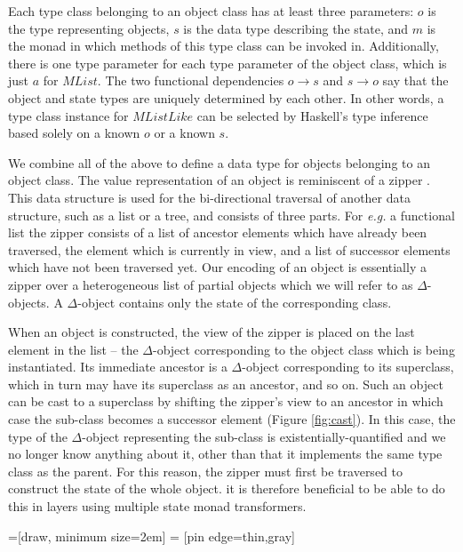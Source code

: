 Each type class belonging to an object class has at least three parameters: $o$ is the type representing objects, $s$ is the data type describing the state, and $m$ is the monad in which methods of this type class can be invoked in. Additionally, there is one type parameter for each type parameter of the object class, which is just $a$ for $\mathit{MList}$. The two functional dependencies $o \to s$ and $s \to o$ say that the object and state types are uniquely determined by each other. In other words, a type class instance for $\mathit{MListLike}$ can be selected by Haskell's type inference based solely on a known $o$ or a known $s$.

We combine all of the above to define a data type for objects belonging to an object class. The value representation of an object is reminiscent of a zipper \cite{huet1997zipper}. This data structure is used for the bi-directional traversal of another data structure, such as a list or a tree, and consists of three parts. For \emph{e.g.} a functional list the zipper consists of a list of ancestor elements which have already been traversed, the element which is currently in view, and a list of successor elements which have not been traversed yet. Our encoding of an object is essentially a zipper over a heterogeneous list of partial objects which we will refer to as $\Delta$-objects. A $\Delta$-object contains only the state of the corresponding class.

When an object is constructed, the view of the zipper is placed on the last element in the list -- the $\Delta$-object corresponding to the object class which is being instantiated. Its immediate ancestor is a $\Delta$-object corresponding to its superclass, which in turn may have its superclass as an ancestor, and so on. Such an object can be cast to a superclass by shifting the zipper's view to an ancestor in which case the sub-class becomes a successor element (Figure \ref{fig:cast}). In this case, the type of the $\Delta$-object representing the sub-class is existentially-quantified and we no longer know anything about it, other than that it implements the same type class as the parent. For this reason, the zipper must first be traversed to construct the state of the whole object. it is therefore beneficial to be able to do this in layers using multiple state monad transformers.

=[draw, minimum size=2em]
 = [pin edge={thin,gray}]

